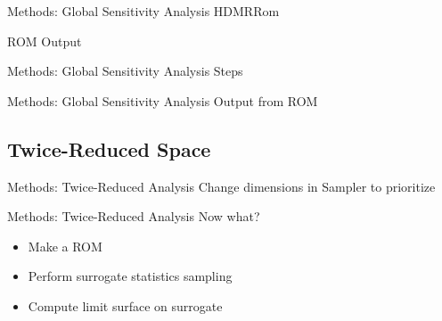 \documentclass[t,9pt,svgnames]{beamer}
\begin{document}
\begin{frame}[fragile]{Methods: Global Sensitivity Analysis}
  \vfill
  HDMRRom
  
  \vfill
  ROM Output
  
  \vfill
\end{frame}

\begin{frame}[fragile]{Methods: Global Sensitivity Analysis}
  \vfill
  Steps
  
  \vfill
\end{frame}

\begin{frame}[fragile]{Methods: Global Sensitivity Analysis}
  \vfill
  Output from ROM
  
  \vfill
\end{frame}

\subsection{Twice-Reduced Space}
\begin{frame}[fragile]{Methods: Twice-Reduced Analysis}
  \vfill
  Change dimensions in Sampler to prioritize
  
  \vfill
\end{frame}

\begin{frame}[fragile]{Methods: Twice-Reduced Analysis}
  \vfill
  Now what?
  \vfill
  \begin{itemize}
    \item Make a ROM
  \vfill
    \item Perform surrogate statistics sampling
  \vfill
    \item Compute limit surface on surrogate
  \end{itemize}
  \vfill
\end{frame}
\end{document}

